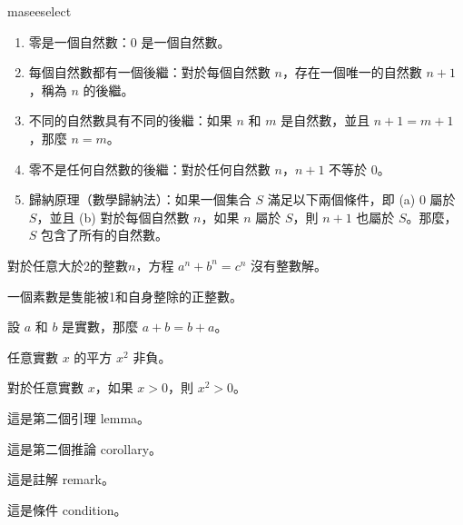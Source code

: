 \documentclass[writingLanguage=chinese,
    addPageTitle=on,
    addDeclaration=on,
    addMUSTlog=off,
    addFigTOC=on,   
    addTabTOC=on,
    refIndent=off,
    printMod=off,
]{.def/must}
\begin{document}
\begin{axiom}[皮亞諾公理 1]
maseeselect
\begin{enumerate}[label=\Alph*.]
\item 零是一個自然數：$0$ 是一個自然數。
\item 每個自然數都有一個後繼：對於每個自然數 $n$，存在一個唯一的自然數 $n+1$，稱為 $n$ 的後繼。
\item 不同的自然數具有不同的後繼：如果 $n$ 和 $m$ 是自然數，並且 $n+1 = m+1$，那麼 $n = m$。
\item 零不是任何自然數的後繼：對於任何自然數 $n$，$n+1$ 不等於 $0$。
\item 歸納原理（數學歸納法）：如果一個集合 $S$ 滿足以下兩個條件，即 (a) $0$ 屬於 $S$，並且 (b) 對於每個自然數 $n$，如果 $n$ 屬於 $S$，則 $n+1$ 也屬於 $S$。那麼，$S$ 包含了所有的自然數。
\end{enumerate}
\end{axiom}

\begin{theorem}[費馬定理]
對於任意大於2的整數$n$，方程 $a^n + b^n = c^n$ 沒有整數解。
\end{theorem}



\begin{definition}
    一個素數是隻能被1和自身整除的正整數。
\end{definition}
\begin{example}
    設 $a$ 和 $b$ 是實數，那麼 $a+b=b+a$。
\end{example}

\begin{property}
    任意實數 $x$ 的平方 $x^2$ 非負。
\end{property}
\begin{proposition}
    對於任意實數 $x$，如果 $x > 0$，則 $x^2 > 0$。
\end{proposition}
\begin{lemma}
這是第二個引理 lemma。
\end{lemma}

\begin{corollary}
這是第二個推論 corollary。
\end{corollary}

\begin{remark}
這是註解 remark。
\end{remark}



\begin{condition}
這是條件 condition。
\end{condition}
\end{document}
